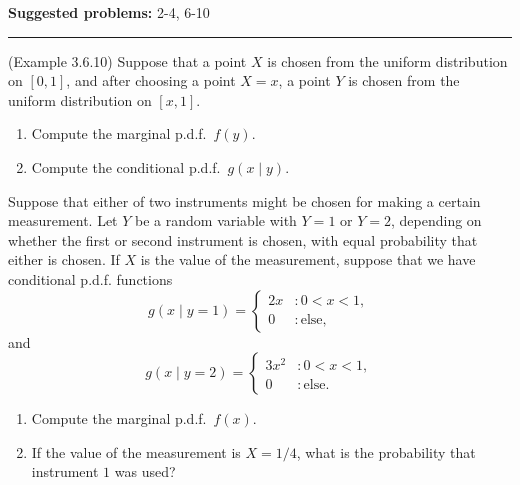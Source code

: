 \documentclass[12pt,reqno]{amsart}
\begin{document}
\textbf{Suggested problems:} 2-4, 6-10

\bigskip
\hrule

\bigskip
\prob (Example 3.6.10) Suppose that a point $X$ is chosen from the uniform distribution on $[0,1]$, and after choosing a point $X=x$, a point $Y$ is chosen from the uniform distribution on $[x,1]$.

\medskip
\begin{enumerate}
\item Compute the marginal p.d.f.\ $f(y)$.\vfill
\item Compute the conditional p.d.f.\ $g(x\mid y)$.\vfill
\end{enumerate}

\newpage
\prob Suppose that either of two instruments might be chosen for making a certain measurement. Let $Y$ be a random variable with $Y=1$ or $Y=2$, depending on whether the first or second instrument is chosen, with equal probability that either is chosen. If $X$ is the value of the measurement, suppose that we have conditional p.d.f. functions
\[
	g(x\mid y=1) = \begin{cases}
	2x & : 0 < x < 1, \\
	0 & : \text{else},
	\end{cases}
\]
and
\[
	g(x\mid y=2) = \begin{cases}
	3x^2 & : 0 < x < 1, \\
	0 & : \text{else}.
	\end{cases}
\]
\begin{enumerate}
\item Compute the marginal p.d.f.\ $f(x)$.\vfill
\item If the value of the measurement is $X=1/4$, what is the probability that instrument $1$ was used?\vfill
\end{enumerate}
\end{document}
